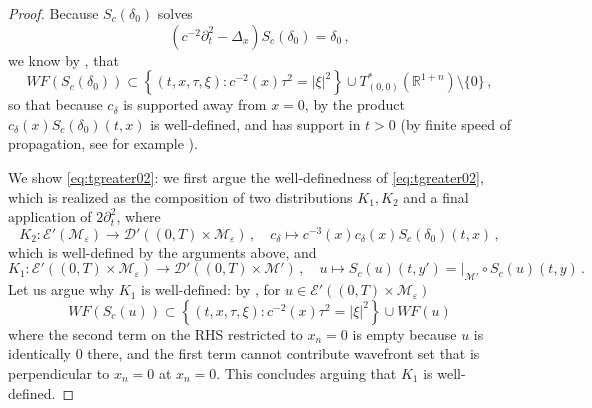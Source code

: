\documentclass[
	fontsize=11pt, 
	twoside=false, 
	abstract=true, 
	a4paper,
]{scrartcl}
\newcommand{\eps}{\varepsilon}
\newcommand{\sem}{\setminus\{0\}}
\newcommand{\RR}{\mathbb{R}}
\newcommand{\dd}{\mathrm{d}}
\newcommand{\abs}[1]{\left\lvert#1\right\rvert}
\newcommand{\del}{\partial}
\begin{document}
\begin{proof}
%
%
%
	Because $S_c(\delta_0)$ solves 
	\[
		\left(c^{-2}\del_t^2 -\Delta_x\right)S_c(\delta_0) = \delta_0\,,
	\]
	we know by \cite[Thm.~8.3.1]{hoermander1}, that 
	\[
		WF(S_c(\delta_0)) \subset \left\{(t,x,\tau,\xi)\colon c^{-2}(x)\tau^2 = \abs{\xi}^2\right\} \cup T^\ast_{(0,0)}(\RR^{1+n})\setminus\{0\}\,, %
	\]
	so that because $c_\delta$ is supported away from $x=0$, by \cite[Thm.~8.2.10]{hoermander1} the product $c_\delta(x) S_c(\delta_0)(t,x)$ is well-defined, and %
	has support in $t>0$ (by finite speed of propagation, see for example \cite[p.~35]{zbMATH05129478}). %

	We show \cref{eq:tgreater02}: we first argue the well-definedness of \cref{eq:tgreater02}, which is realized as the composition of two distributions $K_1,K_2$ and a final application of $2\del_t^2$, where
	\[
		K_2 \colon \mathcal{E}'(\mathcal{M}_\eps) \to \mathcal{D}'((0,T)\times \mathcal{M}_\eps)\,,\quad c_\delta\mapsto c^{-3}(x)c_\delta(x) S_c(\delta_0)(t,x)\,,
	\]
	which is well-defined by the arguments above, and
	\[
		K_1 \colon \mathcal{E}'((0,T)\times \mathcal{M}_\eps) \to \mathcal{D}'((0,T)\times \mathcal{M}')\,, \quad u \mapsto S_c(u)(t,y') = \vert_{\mathcal{M}'} \circ S_c(u)(t,y)\,.
	\]
	Let us argue why $K_1$ is well-defined: by \cite[Thm.~8.3.1]{hoermander1}, for $u\in \mathcal{E}'((0,T)\times \mathcal{M}_\eps)$
	\[
		WF(S_{c}(u)) \subset \left\{(t,x,\tau,\xi)\colon c^{-2}(x)\tau^2 = \abs{\xi}^2\right\} \cup WF(u)
	\]
	where the second term on the RHS restricted to $x_n=0$ is empty because $u$ is identically $0$ there, and the first term cannot contribute wavefront set that is perpendicular to $x_n=0$ at $x_n=0$. This concludes arguing that $K_1$ is well-defined.
	

\end{proof}
\end{document}
